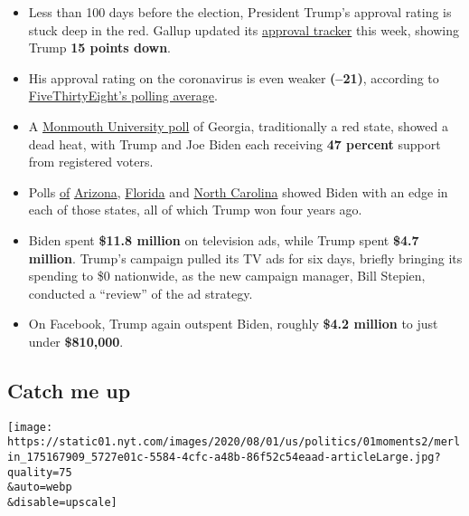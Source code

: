 \begin{itemize}
\item
  Less than 100 days before the election, President Trump's approval
  rating is stuck deep in the red. Gallup updated its
  \href{https://news.gallup.com/poll/203207/trump-job-approval-weekly.aspx}{approval
  tracker} this week, showing Trump \textbf{15 points down}.
\item
  His approval rating on the coronavirus is even weaker \textbf{(--21)},
  according to
  \href{https://projects.fivethirtyeight.com/coronavirus-polls/}{FiveThirtyEight's
  polling average}.
\item
  A
  \href{https://www.monmouth.edu/polling-institute/reports/monmouthpoll_GA_072920/}{Monmouth
  University poll} of Georgia, traditionally a red state, showed a dead
  heat, with Trump and Joe Biden each receiving \textbf{47 percent}
  support from registered voters.
\item
  Polls
  \href{http://maristpoll.marist.edu/wp-content/uploads/2020/07/NBC-News_Marist-Poll-AZ-NOS-and-Tables_202007231249.pdf}{of}
  \href{https://cdn.cnn.com/cnn/2020/images/07/26/rel1_az.pdf}{Arizona},
  \href{https://cdn.cnn.com/cnn/2020/images/07/26/rel1_fl.pdf}{Florida}
  and
  \href{https://assets.documentcloud.org/documents/7007170/NBC-News-Marist-Poll-NC-Annotated-Questionnaire.pdf}{North
  Carolina} showed Biden with an edge in each of those states, all of
  which Trump won four years ago.
\end{itemize}

\begin{itemize}
\item
  Biden spent \textbf{\$11.8 million} on television ads, while Trump
  spent \textbf{\$4.7 million}. Trump's campaign pulled its TV ads for
  six days, briefly bringing its spending to \$0 nationwide, as the new
  campaign manager, Bill Stepien, conducted a ``review'' of the ad
  strategy.
\item
  On Facebook, Trump again outspent Biden, roughly \textbf{\$4.2
  million} to just under \textbf{\$810,000}.
\end{itemize}

\hypertarget{catch-me-up}{%
\subsection{Catch me up}\label{catch-me-up}}

\texttt{[image: https://static01.nyt.com/images/2020/08/01/us/politics/01moments2/merlin\_175167909\_5727e01c-5584-4cfc-a48b-86f52c54eaad-articleLarge.jpg?quality=75\\\&auto=webp\\\&disable=upscale]}

